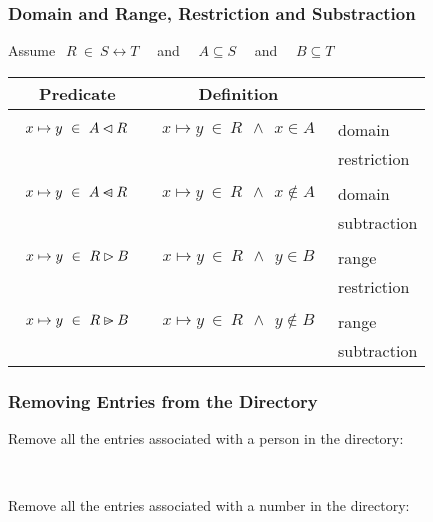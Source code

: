 \documentclass{beamer}
\begin{document}
\begin{frame}


\frametitle{Domain and Range, Restriction and Substraction}

Assume $~~R ~\in~ S\rel T $   ~~and~~ $A\subseteq S$ ~~and~~ $B\subseteq T$

\begin{center}
\begin{tabular}{|c|c|l|}
\hline
Predicate & Definition & \\[2pt] \hline
&&\\
$~~x\mapsto y   ~\in~ A\mathbin\lhd R   ~~$ &  $~~x\mapsto y ~\in~ R ~~\land~~ x\in A~~$ 
& \mbox{domain } \\
&& \mbox{restriction} \\ \hline &&\\
$~~x\mapsto y   ~\in~ A\mathbin{\lhd\mkern-14mu-} R   ~~$ &  $~~x\mapsto y ~\in~ R ~~\land~~ x\not\in A~~$  
& \mbox{domain } \\
&& \mbox{subtraction} \\ \hline &&\\
$~~x\mapsto y   ~\in~ R\mathbin\rhd B   ~~$ &  $~~x\mapsto y ~\in~ R ~~\land~~ y \in B~~$ 
& \mbox{range } \\
&& \mbox{restriction} \\ \hline &&\\
$~~x\mapsto y   ~\in~ R\mathbin{\rhd\mkern-14mu-} B   ~~$ &  $~~x\mapsto y ~\in~ R ~~\land~~ y \not\in B~~$ 
& \mbox{range } \\
&& \mbox{subtraction} \\ \hline
\end{tabular}
\end{center}




\end{frame}



\begin{frame}

\frametitle{Removing Entries from the Directory}

Remove all the entries associated with a person in the directory:

~

Remove all the entries associated with a number in the directory:


\end{frame}
\end{document}
